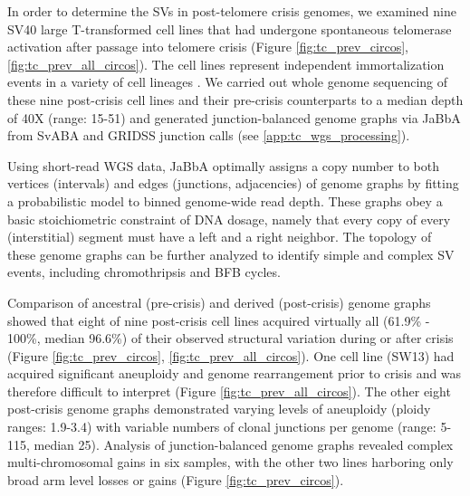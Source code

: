 \documentclass[phd,tocprelim]{cornell}
\begin{document}
In order to determine the SVs in post-telomere crisis genomes, we examined nine SV40 large T-transformed cell lines that had undergone spontaneous telomerase activation after passage into telomere crisis (Figure \ref{fig:tc_prev_circos}, \ref{fig:tc_prev_all_circos}). The cell lines represent independent immortalization events in a variety of cell lineages \cite{Bryan1995-ik,Shay1989-ua,Counter1992-yg}. We carried out whole genome sequencing of these nine post-crisis cell lines and their pre-crisis counterparts to a median depth of 40X (range: 15-51) and generated junction-balanced genome graphs\cite{Hadi2020-um} via JaBbA from SvABA\cite{Wala2018-qa} and GRIDSS\cite{Cameron2021-db} junction calls (see \ref{app:tc_wgs_processing}).

Using short-read WGS data, JaBbA optimally assigns a copy number to both vertices (intervals) and edges (junctions, adjacencies) of genome graphs by fitting a probabilistic model to binned genome-wide read depth. These graphs obey a basic stoichiometric constraint of DNA dosage, namely that every copy of every (interstitial) segment must have a left and a right neighbor. The topology of these genome graphs can be further analyzed to identify simple and complex SV events, including chromothripsis and BFB cycles.

Comparison of ancestral (pre-crisis) and derived (post-crisis) genome graphs showed that eight of nine post-crisis cell lines acquired virtually all (61.9\% - 100\%, median 96.6\%) of their observed structural variation during or after crisis (Figure \ref{fig:tc_prev_circos}, \ref{fig:tc_prev_all_circos}). One cell line (SW13) had acquired significant aneuploidy and genome rearrangement prior to crisis and was therefore difficult to interpret (Figure \ref{fig:tc_prev_all_circos}). The other eight post-crisis genome graphs demonstrated varying levels of aneuploidy (ploidy ranges: 1.9-3.4) with variable numbers of clonal junctions per genome (range: 5-115, median 25). Analysis of junction-balanced genome graphs \cite{Hadi2020-um} revealed complex multi-chromosomal gains in six samples, with the other two lines harboring only broad arm level losses or gains (Figure \ref{fig:tc_prev_circos}).
\end{document}
